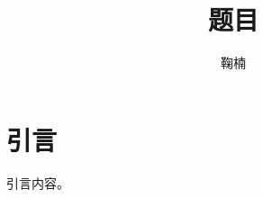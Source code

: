 \documentclass[Doctor]{BJTU-Thesis}
\author{鞠楠}
\title{题目}
\begin{document}
	\makeAuthorization
	\makeInfo
	
	
	
	\tableofcontents
	\chapter{引言}
	引言内容。
\end{document}
